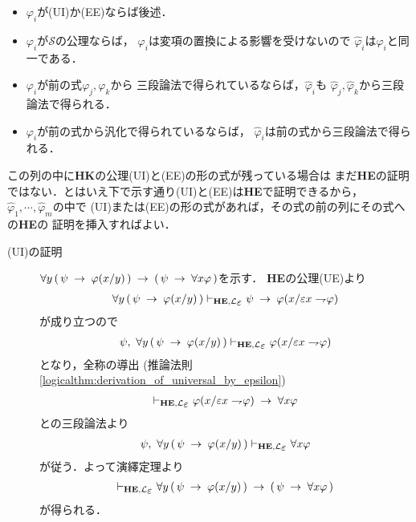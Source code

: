 \begin{metaprf}
\begin{description}
\begin{itemize}
					\item $\varphi_{i}$が(UI)か(EE)ならば後述．
					
					\item $\varphi_{i}$が$\mathscr{S}$の公理ならば，
						$\varphi_{i}$は変項の置換による影響を受けないので
						$\hat{\varphi}_{i}$は$\varphi_{i}$と同一である．
					
					\item $\varphi_{i}$が前の式$\varphi_{j},\varphi_{k}$から
						三段論法で得られているならば，$\hat{\varphi}_{i}$も
						$\hat{\varphi}_{j},\hat{\varphi}_{k}$から三段論法で得られる．
					
					\item $\varphi_{i}$が前の式から汎化で得られているならば，
						$\hat{\varphi}_{i}$は前の式から三段論法で得られる．
				\end{itemize}
			
				この列の中に{\bf HK}の公理(UI)と(EE)の形の式が残っている場合は
				まだ{\bf HE}の証明ではない．とはいえ下で示す通り(UI)と(EE)は{\bf HE}で証明できるから，
				$\hat{\varphi}_{1},\cdots,\hat{\varphi}_{m}$の中で
				(UI)または(EE)の形の式があれば，その式の前の列にその式への{\bf HE}の
				証明を挿入すればよい．
				
				\begin{description}
					\item[(UI)の証明]
						$\forall y\, (\, \psi \hspace{0.25em}\rightarrow\hspace{0.25em} \varphi(x/y)\, ) 
						\hspace{0.25em}\rightarrow\hspace{0.25em} (\, \psi \hspace{0.25em}\rightarrow\hspace{0.25em} \forall x \varphi\, )$を示す．
						{\bf HE}の公理(UE)より
						\begin{align}
							\forall y\, (\, \psi \rarrow \varphi(x/y)\, ) \provable{\mbox{{\bf HE}},\lang{\varepsilon}} 
							\psi \rarrow \varphi(x/\varepsilon x \negation \varphi)
						\end{align}
						が成り立つので
						\begin{align}
							\psi,\ \forall y\, (\, \psi \rarrow \varphi(x/y)\, ) \provable{\mbox{{\bf HE}},\lang{\varepsilon}} 
							\varphi(x/\varepsilon x \negation \varphi)
						\end{align}
						となり，全称の導出
						(推論法則\ref{logicalthm:derivation_of_universal_by_epsilon})
						\begin{align}
							\provable{\mbox{{\bf HE}},\lang{\varepsilon}} \varphi(x/\varepsilon x \negation \varphi)
							\rarrow \forall x \varphi
						\end{align}
						との三段論法より
						\begin{align}
							\psi,\ \forall y\, (\, \psi \rarrow \varphi(x/y)\, ) \provable{\mbox{{\bf HE}},\lang{\varepsilon}}
							\forall x \varphi
						\end{align}
						が従う．よって演繹定理より
						\begin{align}
							\provable{\mbox{{\bf HE}},\lang{\varepsilon}} \forall y\, (\, \psi \rarrow \varphi(x/y)\, )
							\rarrow (\, \psi \rarrow \forall x \varphi\, )
						\end{align}
						が得られる．
					

\end{description}
\end{description}
\end{metaprf}
